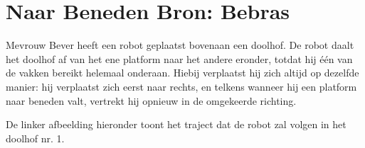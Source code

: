 \documentclass[12pt]{article}
\begin{document}
	\begin{minipage}{\textwidth}
		\section{Naar Beneden \hfill\small Bron: Bebras}
			Mevrouw Bever heeft een robot geplaatst bovenaan een doolhof. De robot daalt het doolhof af van het ene platform naar het andere eronder, totdat hij één van de vakken bereikt helemaal onderaan. Hiebij verplaatst hij zich altijd op dezelfde manier: hij verplaatst zich eerst naar rechts, en telkens wanneer hij een platform naar beneden valt, vertrekt hij opnieuw in de omgekeerde richting.
			
			De linker afbeelding hieronder toont het traject dat de robot zal volgen in het doolhof nr. 1. \\
	

\end{minipage}
\end{document}
